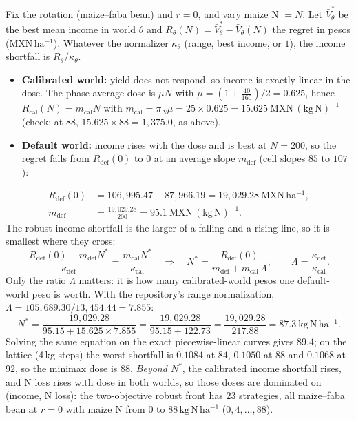 \documentclass[11pt,a4paper]{article}
\newcommand{\kgNha}{\mathrm{kg\,N\,ha^{-1}}}
\newcommand{\mxnha}{\mathrm{MXN\,ha^{-1}}}
\newcommand{\mxnkgN}{\mathrm{MXN\,(kg\,N)^{-1}}}
\begin{document}
Fix the rotation (maize--faba bean) and $r=0$, and vary maize N $=N$. Let $\bar V^\ast_\theta$ be the best mean income in world $\theta$ and
$R_\theta(N)=\bar V^\ast_\theta-\bar V_\theta(N)$ the regret in pesos ($\mxnha$). Whatever the normalizer $\kappa_\theta$ (range, best income, or $1$), the income shortfall is $R_\theta/\kappa_\theta$.
\begin{itemize}
\item \textbf{Calibrated world:} yield does not respond, so income is exactly linear in the dose. The phase-average dose is $\mu N$ with $\mu=(1+\tfrac{40}{160})/2=0.625$, hence
  $R_{\mathrm{cal}}(N)=m_{\mathrm{cal}}N$ with $m_{\mathrm{cal}}=\pi_N\mu=25\times0.625=15.625\ \mxnkgN$ (check: at $88$, $15.625\times88=1{,}375.0$, as above).
\item \textbf{Default world:} income rises with the dose and is best at $N=200$, so the regret falls from $R_{\mathrm{def}}(0)$ to $0$ at an average slope $m_{\mathrm{def}}$ (cell slopes $85$ to $107$):
\end{itemize}
\begin{equation}
\begin{aligned}
R_{\mathrm{def}}(0)&=106{,}995.47-87{,}966.19=19{,}029.28\ \mxnha,\\
m_{\mathrm{def}}&=\frac{19{,}029.28}{200}=95.1\ \mxnkgN .
\end{aligned}
\end{equation}
The robust income shortfall is the larger of a falling and a rising line, so it is smallest where they cross:
\begin{equation}
\frac{R_{\mathrm{def}}(0)-m_{\mathrm{def}} N^\ast}{\kappa_{\mathrm{def}}}=\frac{m_{\mathrm{cal}} N^\ast}{\kappa_{\mathrm{cal}}}
\quad\Longrightarrow\quad
N^\ast=\frac{R_{\mathrm{def}}(0)}{m_{\mathrm{def}}+m_{\mathrm{cal}}\,\Lambda},\qquad \Lambda=\frac{\kappa_{\mathrm{def}}}{\kappa_{\mathrm{cal}}} .
\label{eq:minimax}
\end{equation}
Only the ratio $\Lambda$ matters: it is how many calibrated-world pesos one default-world peso is worth. With the repository's range normalization,
$\Lambda=105{,}689.30/13{,}454.44=7.855$:
\begin{equation}
N^\ast=\frac{19{,}029.28}{95.15+15.625\times7.855}=\frac{19{,}029.28}{95.15+122.73}=\frac{19{,}029.28}{217.88}=87.3\ \kgNha .
\end{equation}
Solving the same equation on the exact piecewise-linear curves gives $89.4$; on the lattice (4\,kg steps) the worst shortfall is $0.1084$ at $84$, $0.1050$ at $88$ and $0.1068$ at $92$, so the
minimax dose is $88$. \emph{Beyond $N^\ast$}, the calibrated income shortfall rises, and N loss rises with dose in both worlds, so those doses are dominated on (income, N loss): the two-objective robust front has $23$ strategies, all maize--faba bean
at $r=0$ with maize N from $0$ to $88\,\kgNha$ ($0,4,\dots,88$).
\end{document}

